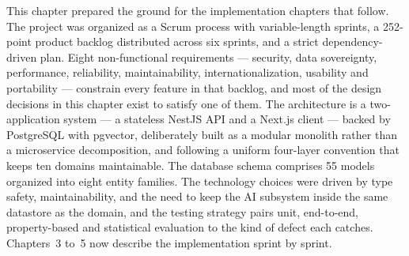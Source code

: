 This chapter prepared the ground for the implementation chapters that follow. The project was
organized as a Scrum process with variable-length sprints, a 252-point product backlog
distributed across six sprints, and a strict dependency-driven plan. Eight non-functional
requirements --- security, data sovereignty, performance, reliability, maintainability,
internationalization, usability and portability --- constrain every feature in that backlog, and
most of the design decisions in this chapter exist to satisfy one of them. The architecture is a
two-application system --- a stateless NestJS API and a Next.js client --- backed by PostgreSQL
with pgvector, deliberately built as a modular monolith rather than a microservice
decomposition, and following a uniform four-layer convention that keeps ten domains
maintainable. The database schema comprises 55 models organized into eight entity families. The
technology choices were driven by type safety, maintainability, and the need to keep the AI
subsystem inside the same datastore as the domain, and the testing strategy pairs unit,
end-to-end, property-based and statistical evaluation to the kind of defect each catches.
Chapters~3 to~5 now describe the implementation sprint by sprint.
